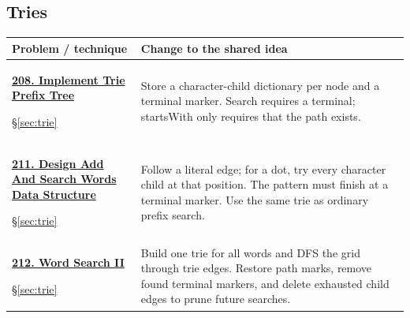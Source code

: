 \documentclass[11pt]{article}
\newcommand{\sect}[1]{\hyperref[sec:#1]{\S\ref*{sec:#1}}}
\begin{document}
\subsection{Tries}
\begin{longtable}{@{}L{4.3cm}L{11.7cm}@{}}
\toprule Problem / technique & Change to the shared idea \\ \midrule\endhead
\hypertarget{lc208}{}\href{https://leetcode.com/problems/implement-trie-prefix-tree/}{\textbf{208. Implement Trie Prefix Tree}}\par\sect{trie} & Store a character-child dictionary per node and a terminal marker. Search requires a terminal; startsWith only requires that the path exists.\\[4pt]
\hypertarget{lc211}{}\href{https://leetcode.com/problems/design-add-and-search-words-data-structure/}{\textbf{211. Design Add And Search Words Data Structure}}\par\sect{trie} & Follow a literal edge; for a dot, try every character child at that position. The pattern must finish at a terminal marker. Use the same trie as ordinary prefix search.\\[4pt]
\hypertarget{lc212}{}\href{https://leetcode.com/problems/word-search-ii/}{\textbf{212. Word Search II}}\par\sect{trie} & Build one trie for all words and DFS the grid through trie edges. Restore path marks, remove found terminal markers, and delete exhausted child edges to prune future searches.\\[4pt]
\bottomrule
\end{longtable}
\end{document}
